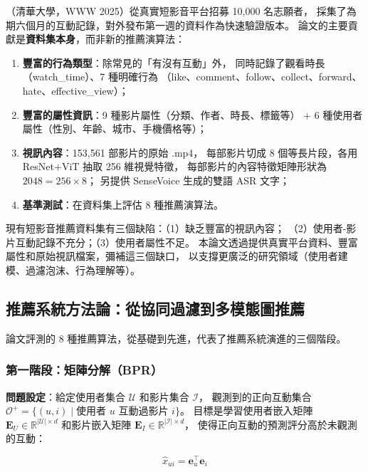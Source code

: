 \documentclass[12pt, a4paper]{article}
\begin{document}
\citet{shang2025shortvideo}（清華大學，WWW 2025）從真實短影音平台招募 10,000 名志願者，
採集了為期六個月的互動記錄，對外發布第一週的資料作為快速驗證版本。
論文的主要貢獻是\textbf{資料集本身}，而非新的推薦演算法：

\begin{enumerate}[leftmargin=*]
\item \textbf{豐富的行為類型}：除常見的「有沒有互動」外，
  同時記錄了觀看時長（watch\_time）、7 種明確行為
  （like、comment、follow、collect、forward、hate、effective\_view）；
\item \textbf{豐富的屬性資訊}：9 種影片屬性（分類、作者、時長、標籤等）
  + 6 種使用者屬性（性別、年齡、城市、手機價格等）；
\item \textbf{視訊內容}：153,561 部影片的原始 .mp4，
  每部影片切成 8 個等長片段，各用 ResNet+ViT 抽取 256 維視覺特徵，
  每部影片的內容特徵矩陣形狀為 $2048 = 256 \times 8$；
  另提供 SenseVoice 生成的雙語 ASR 文字；
\item \textbf{基準測試}：在資料集上評估 8 種推薦演算法。
\end{enumerate}

\begin{paperbox2}[論文的核心主張]
現有短影音推薦資料集有三個缺陷：（1）缺乏豐富的視訊內容；
（2）使用者-影片互動記錄不充分；（3）使用者屬性不足。
本論文透過提供真實平台資料、豐富屬性和原始視訊檔案，彌補這三個缺口，
以支撐更廣泛的研究領域（使用者建模、過濾泡沫、行為理解等）。
\end{paperbox2}

\subsection{推薦系統方法論：從協同過濾到多模態圖推薦}

論文評測的 8 種推薦算法，從基礎到先進，代表了推薦系統演進的三個階段。

\subsubsection{第一階段：矩陣分解（BPR）}

\textbf{問題設定}：給定使用者集合 $\mathcal{U}$ 和影片集合 $\mathcal{I}$，
觀測到的正向互動集合 $\mathcal{O}^+ = \{(u, i) \mid \text{使用者 } u \text{ 互動過影片 } i\}$。
目標是學習使用者嵌入矩陣 $\mathbf{E}_U \in \mathbb{R}^{|\mathcal{U}| \times d}$
和影片嵌入矩陣 $\mathbf{E}_I \in \mathbb{R}^{|\mathcal{I}| \times d}$，
使得正向互動的預測評分高於未觀測的互動：

\begin{equation}
\hat{x}_{ui} = \mathbf{e}_u^\top \mathbf{e}_i
\end{equation}
\end{document}
